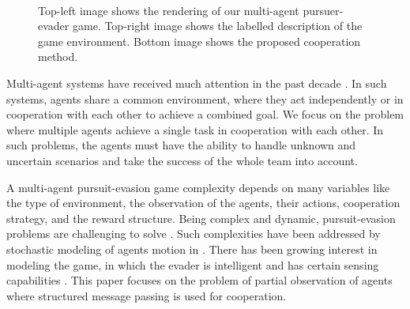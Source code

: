 \documentclass[conference]{IEEEtran}
\begin{document}
\begin{figure}[t]
        \vspace{1mm}
         \\
        \vspace{1mm}
     \caption{Top-left image shows the rendering of our multi-agent pursuer-evader game. Top-right image shows the labelled description of the game environment. Bottom image shows the proposed cooperation method.}
     \label{fig:teaser}
\end{figure}

Multi-agent systems have received much attention in the past decade \cite{kuo2015, pmlr-v48-he16, Littman1994, MirowskiPVSBBDG16}. In such systems, agents share a common environment, where they act independently or in cooperation with each other to achieve a combined goal. We focus on the problem where multiple agents achieve a single task in cooperation with each other. In such problems, the agents must have the ability to handle unknown and uncertain scenarios and take the success of the whole team into account.

A multi-agent pursuit-evasion game complexity depends on many variables like the type of environment, the observation of the agents, their actions, cooperation strategy, and the reward structure. Being complex and dynamic, pursuit-evasion problems are challenging to solve \cite{antoniades2003}. Such complexities have been addressed by stochastic modeling of agents motion in \cite{Hespanha01greedycontrol, GUIBAS1999}. There has been growing interest in modeling the game, in which the evader is intelligent and has certain sensing capabilities \cite{vidal2002}. This paper focuses on the problem of partial observation of agents where structured message passing is used for cooperation.
\end{document}
